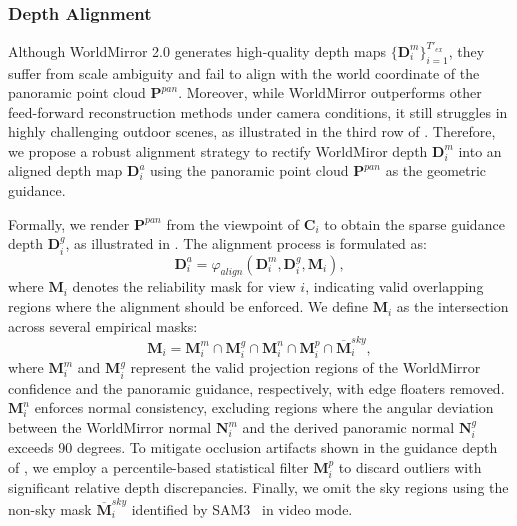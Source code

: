 \documentclass{article} %
\begin{document}
\subsubsection{Depth Alignment}
Although WorldMirror 2.0 generates high-quality depth maps $\{\mathbf{D}^{m}_i\}_{i=1}^{T'_{ex}}$, they suffer from scale ambiguity and fail to align with the world coordinate of the panoramic point cloud $\mathbf{P}^{pan}$.
Moreover, while WorldMirror outperforms other feed-forward reconstruction methods under camera conditions, it still struggles in highly challenging outdoor scenes, as illustrated in the third row of .
Therefore, we propose a robust alignment strategy to rectify WorldMiror depth $\mathbf{D}^{m}_i$ into an aligned depth map $\mathbf{D}^{a}_i$ using the panoramic point cloud $\mathbf{P}^{pan}$ as the geometric guidance.

Formally, we render $\mathbf{P}^{pan}$ from the viewpoint of $\mathbf{C}_i$ to obtain the sparse guidance depth $\mathbf{D}^{g}_i$, as illustrated in .
The alignment process is formulated as:
\begin{equation}
\mathbf{D}^a_i=\varphi_{align}\left(\mathbf{D}^m_i,\mathbf{D}^g_i,\mathbf{M}_i\right),
\label{eq_alignment}
\end{equation}
where $\mathbf{M}_i$ denotes the reliability mask for view $i$, indicating valid overlapping regions where the alignment should be enforced.
We define $\mathbf{M}_i$ as the intersection across several empirical masks:
\begin{equation}
\mathbf{M}_i=\mathbf{M}^{m}_i\cap\mathbf{M}^{g}_i\cap\mathbf{M}^n_i\cap\mathbf{M}^p_i\cap\overline{\mathbf{M}}^{sky}_i,
\label{eq_valid_mask}
\end{equation}
where $\mathbf{M}^{m}_i$ and $\mathbf{M}^{g}_i$ represent the valid projection regions of the WorldMirror confidence and the panoramic guidance, respectively, with edge floaters removed.
$\mathbf{M}^{n}_i$ enforces normal consistency, excluding regions where the angular deviation between the WorldMirror normal $\mathbf{N}^m_i$ and the derived panoramic normal $\mathbf{N}^g_i$ exceeds 90 degrees.
To mitigate occlusion artifacts shown in the guidance depth of , we employ a percentile-based statistical filter $\mathbf{M}^{p}_i$ to discard outliers with significant relative depth discrepancies.
Finally, we omit the sky regions using the non-sky mask $\overline{\mathbf{M}}^{sky}_i$ identified by SAM3~\cite{carion2025sam} in video mode.
\end{document}
